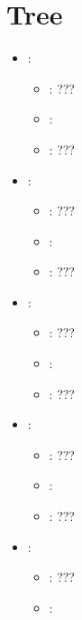 \section{Tree}


\begin{itemize}
    \item {}:
           \begin{itemize}
                \item \optionPossibleValues{}: ???
                \item \optionDefaultValue{}: 
                \item \optionDescrption{}: ???
           \end{itemize}
    \item {}:
           \begin{itemize}
                \item \optionPossibleValues{}: ???
                \item \optionDefaultValue{}: 
                \item \optionDescrption{}: ???
           \end{itemize}
    \item {}:
           \begin{itemize}
                \item \optionPossibleValues{}: ???
                \item \optionDefaultValue{}: 
                \item \optionDescrption{}: ???
           \end{itemize}
    \item {}:
           \begin{itemize}
                \item \optionPossibleValues{}: ???
                \item \optionDefaultValue{}: 
                \item \optionDescrption{}: ???
           \end{itemize}
    \item {}:
           \begin{itemize}
                \item \optionPossibleValues{}: ???
                \item \optionDefaultValue{}: 

\end{itemize}
\end{itemize}
